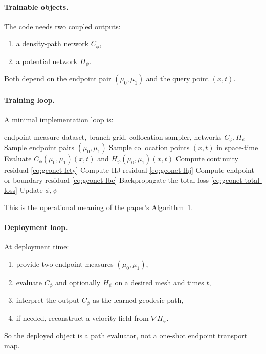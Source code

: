 \documentclass[11pt]{report}
\begin{document}
\paragraph{Trainable objects.}
The code needs two coupled outputs:
\begin{enumerate}[label=(\roman*)]
  \item a density-path network $C_\phi$,
  \item a potential network $H_\psi$.
\end{enumerate}
Both depend on the endpoint pair $(\mu_0,\mu_1)$ and the query point $(x,t)$.

\paragraph{Training loop.}
A minimal implementation loop is:
\begin{algorithm}[ht]
\caption{GeONet training loop}
\begin{algorithmic}[1]
\Require endpoint-measure dataset, branch grid, collocation sampler, networks $C_\phi,H_\psi$
  \State Sample endpoint pairs $(\mu_0,\mu_1)$
  \State Sample collocation points $(x,t)$ in space-time
  \State Evaluate $C_\phi(\mu_0,\mu_1)(x,t)$ and $H_\psi(\mu_0,\mu_1)(x,t)$
  \State Compute continuity residual \eqref{eq:geonet-lcty}
  \State Compute HJ residual \eqref{eq:geonet-lhj}
  \State Compute endpoint or boundary residual \eqref{eq:geonet-lbc}
  \State Backpropagate the total loss \eqref{eq:geonet-total-loss}
  \State Update $\phi,\psi$
\EndFor
\end{algorithmic}
\end{algorithm}
This is the operational meaning of the paper's Algorithm~1.

\paragraph{Deployment loop.}
At deployment time:
\begin{enumerate}[label=(\arabic*)]
  \item provide two endpoint measures $(\mu_0,\mu_1)$,
  \item evaluate $C_\phi$ and optionally $H_\psi$ on a desired mesh and times $t$,
  \item interpret the output $C_\phi$ as the learned geodesic path,
  \item if needed, reconstruct a velocity field from $\nabla H_\psi$.
\end{enumerate}
So the deployed object is a path evaluator, not a one-shot endpoint transport map.
\end{document}
